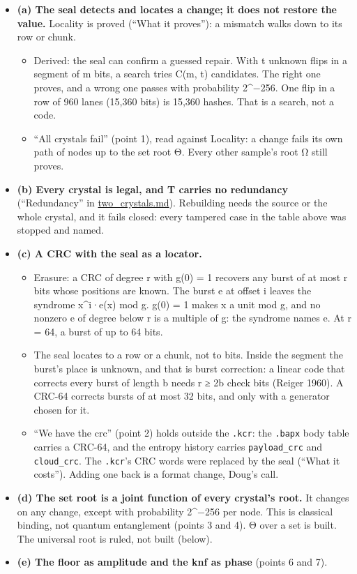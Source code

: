 \begin{itemize}
\item \textbf{(a) The seal detects and locates a change; it does not restore the value.} Locality is proved (“What it proves”): a mismatch walks down to its row or chunk.

\begin{itemize}
\item Derived: the seal can confirm a guessed repair. With t unknown flips in a segment of m bits, a search tries C(m, t) candidates. The right one proves, and a wrong one passes with probability 2\textasciicircum{}−256. One flip in a row of 960 lanes (15,360 bits) is 15,360 hashes. That is a search, not a code.
\item “All crystals fail” (point 1), read against Locality: a change fails its own path of nodes up to the set root Θ. Every other sample's root Ω still proves.
\end{itemize}
\item \textbf{(b) Every crystal is legal, and T carries no redundancy} (“Redundancy” in \hyperref[chap:two-crystals]{two\_\allowbreak{}crystals.md}). Rebuilding needs the source or the whole crystal, and it fails closed: every tampered case in the table above was stopped and named.
\item \textbf{(c) A CRC with the seal as a locator.}

\begin{itemize}
\item Erasure: a CRC of degree r with g(0) = 1 recovers any burst of at most r bits whose positions are known. The burst e at offset i leaves the syndrome x\textasciicircum{}i·e(x) mod g. g(0) = 1 makes x a unit mod g, and no nonzero e of degree below r is a multiple of g: the syndrome names e. At r = 64, a burst of up to 64 bits.
\item The seal locates to a row or a chunk, not to bits. Inside the segment the burst's place is unknown, and that is burst correction: a linear code that corrects every burst of length b needs r ≥ 2b check bits (Reiger 1960). A CRC-64 corrects bursts of at most 32 bits, and only with a generator chosen for it.
\item “We have the crc” (point 2) holds outside the \texttt{.\allowbreak{}kcr}: the \texttt{.\allowbreak{}bapx} body table carries a CRC-64, and the entropy history carries \texttt{payload\_\allowbreak{}crc} and \texttt{cloud\_\allowbreak{}crc}. The \texttt{.\allowbreak{}kcr}'s CRC words were replaced by the seal (“What it costs”). Adding one back is a format change, Doug's call.
\end{itemize}
\item \textbf{(d) The set root is a joint function of every crystal's root.} It changes on any change, except with probability 2\textasciicircum{}−256 per node. This is classical binding, not quantum entanglement (points 3 and 4). Θ over a set is built. The universal root is ruled, not built (below).
\item \textbf{(e) The floor as amplitude and the knf as phase} (points 6 and 7).


\end{itemize}
